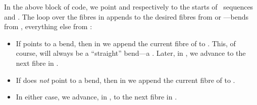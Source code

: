 %
In the above block of code, we point  and 
respectively to the starts of \DNA\ sequences  and .
The  loop over the  fibres in  appends
to  the desired fibres from  or ---bends
from , everything else from :
\begin{itemize}
  \item If  points to a bend, then in 
    we append the current fibre of  to . This, of
    course, will always be a ``straight'' bend---a .
    Later, in , we advance  to the next
    fibre in .
  \item If  does \emph{not} point to a bend, then in
     we append the current fibre of 
    to .
  \item In either case, we advance, in ,
     to the next fibre in .
\end{itemize}

